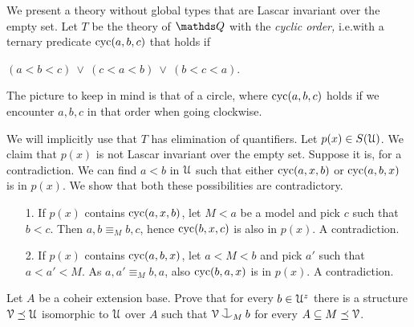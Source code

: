 \begin{example}\label{ex_cyclic_order}
  We present a theory without global types that are Lascar invariant over the empty set.
  Let $T$ be the theory of $\QQ$ with the \emph{cyclic order,} i.e.\@ with a ternary predicate ${\rm cyc}(a, b, c)$ that  holds if

  \hfil $(a < b < c)\ \vee\ (c < a < b)\ \vee\ (b < c < a)$.

  The picture to keep in mind is that of a circle, where ${\rm cyc}(a, b, c)$ holds if we encounter $a,b,c$ in that order when going clockwise.

  We will implicitly use that $T$ has elimination of quantifiers.
  Let $p(x)\in S(\EuScript U)$.
  We claim that $p(x)$ is not Lascar invariant over the empty set.
  Suppose it is, for a contradiction.
  We can find $a<b$ in $\EuScript U$ such that either ${\rm cyc}(a, x, b)$ or ${\rm cyc}(a, b, x)$ is in $p(x)$.
  We show that both these possibilities are contradictory.
  \begin{itemize}
  \item[1.] If $p(x)$ contains ${\rm cyc}(a, x, b)$,
  let $M<a$ be a model and pick $c$ such that $b<c$.
  Then $a, b \equiv_M b, c$, hence ${\rm cyc}(b, x, c)$ is also in $p(x)$.
  A contradiction.
  \item[2.] If $p(x)$ contains ${\rm cyc}(a, b, x)$,
  let $a<M<b$ and pick $a'$ such that $a<a'<M$. 
  As $a, a' \equiv_M b,a$, also  ${\rm cyc}(b, a, x)$ is in $p(x)$.
  A contradiction.
  \end{itemize}
\end{example}

\begin{exercise}
  Let $A$ be a coheir extension base.
  Prove that for every $b\in\EuScript U^z$ there is a structure $\EuScript V\preceq\EuScript U$ isomorphic to $\EuScript U$ over $A$ such that $\V\cnonfork_Mb$ for every $A\subseteq M\preceq\EuScript V$.
\end{exercise}



